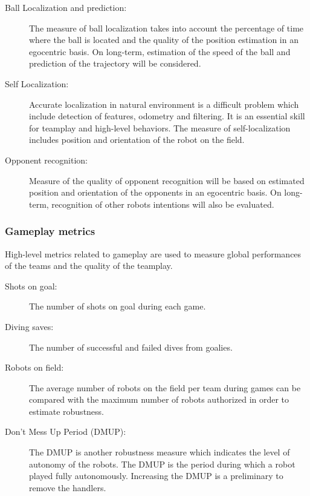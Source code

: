 \documentclass{article}
\begin{document}
\begin{description}
\item[Ball Localization and prediction:] The measure of ball localization takes
  into account the percentage of time where the ball is located and the
  quality of the position estimation in an egocentric basis.
  On long-term, estimation of the speed of the ball and prediction of the trajectory will
  be considered.
\item[Self Localization:] Accurate localization in natural environment is a
  difficult problem which include detection of features, odometry and filtering.
  It is an essential skill for teamplay and high-level behaviors.
  The measure of self-localization includes position and orientation of the robot
  on the field.
\item[Opponent recognition:] Measure of the quality of opponent recognition will
  be based on estimated position and orientation of the opponents in an egocentric
  basis.
  On long-term, recognition of other robots intentions will also be evaluated.
\end{description}

\subsubsection{Gameplay metrics}

High-level metrics related to gameplay are used to measure global performances
of the teams and the quality of the teamplay.

\begin{description}
\item[Shots on goal:] The number of shots on goal during each game.
\item[Diving saves:] The number of successful and failed dives from goalies.
\item[Robots on field:] The average number of robots on the field per team
  during games can be compared with the maximum number of robots authorized
  in order to estimate robustness.
\item[Don't Mess Up Period (DMUP):] The DMUP is another robustness measure which indicates the
  level of autonomy of the robots.
  The DMUP is the period during which a robot played fully autonomously.
  Increasing the DMUP is a preliminary to remove the handlers.
\end{description}
\end{document}
